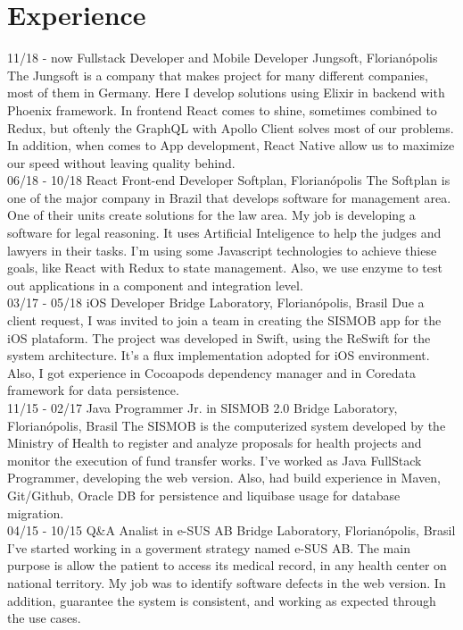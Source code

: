 \documentclass{friggeri-cv}
\begin{document}
\section{Experience}
\begin{entrylist}
  \entry
    {11/18 - now}
    {Fullstack Developer and Mobile Developer}
    {Jungsoft, Florianópolis}
    {The Jungsoft is a company that makes project for many different companies, most of them in Germany. Here I develop solutions using Elixir in backend with Phoenix framework. In frontend React comes to shine, sometimes combined to Redux, but oftenly the GraphQL with Apollo Client solves most of our problems. In addition, when comes to App development, React Native allow us to maximize our speed without leaving quality behind.\\}
  \entry
    {06/18 - 10/18}
    {React Front-end Developer}
    {Softplan, Florianópolis}
    {The Softplan is one of the major company in Brazil that develops software for management area. One of their units create solutions for the law area. My job is developing a software for legal reasoning. It uses Artificial Inteligence to help the judges and lawyers in their tasks. I'm using some Javascript technologies to achieve thiese goals, like React with Redux to state management. Also, we use enzyme to test out applications in a component and integration level. \\}
  \entry
    {03/17 - 05/18}
    {iOS Developer}
    {Bridge Laboratory, Florianópolis, Brasil}
    {Due a client request, I was invited to join a team in creating the SISMOB app for the iOS plataform. The project was developed in Swift, using the ReSwift for the system architecture. It's a flux implementation adopted for iOS environment. Also, I got experience in Cocoapods dependency manager and in Coredata framework for data persistence.\\}
  \entry
    {11/15 - 02/17}
    {Java Programmer Jr. in SISMOB 2.0}
    {Bridge Laboratory, Florianópolis, Brasil}
    {The SISMOB is the computerized system developed by the Ministry of Health to register and analyze proposals for health projects and monitor the execution of fund transfer works. I've worked as Java FullStack Programmer, developing the web version. Also, had build experience in Maven, Git/Github, Oracle DB for persistence and liquibase usage for database migration. \\}
  \entry
    {04/15 - 10/15}
    {Q\&A Analist in e-SUS AB}
    {Bridge Laboratory, Florianópolis, Brasil}
    {I've started working in a goverment strategy named e-SUS AB. The main purpose is allow the patient to access its medical record, in any health center on national territory. My job was to identify software defects in the web version. In addition, guarantee the system is consistent, and working as expected through the use cases.}
\end{entrylist}
\end{document}
